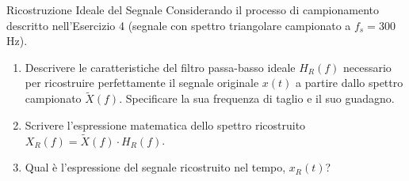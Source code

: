 
\begin{esercizio}{Ricostruzione Ideale del Segnale}
    Considerando il processo di campionamento descritto nell'Esercizio 4 (segnale con spettro triangolare campionato a $f_s = 300$ Hz).
    
    \begin{enumerate}
        \item Descrivere le caratteristiche del filtro passa-basso ideale $H_R(f)$ necessario per ricostruire perfettamente il segnale originale $x(t)$ a partire dallo spettro campionato $\tilde{X}(f)$. Specificare la sua frequenza di taglio e il suo guadagno.
        \item Scrivere l'espressione matematica dello spettro ricostruito $X_R(f) = \tilde{X}(f) \cdot H_R(f)$.
        \item Qual è l'espressione del segnale ricostruito nel tempo, $x_R(t)$?
    \end{enumerate}
\end{esercizio}
